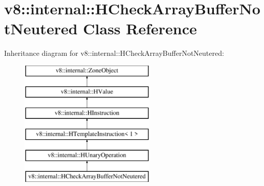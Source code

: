 \hypertarget{classv8_1_1internal_1_1_h_check_array_buffer_not_neutered}{}\section{v8\+:\+:internal\+:\+:H\+Check\+Array\+Buffer\+Not\+Neutered Class Reference}
\label{classv8_1_1internal_1_1_h_check_array_buffer_not_neutered}
Inheritance diagram for v8\+:\+:internal\+:\+:H\+Check\+Array\+Buffer\+Not\+Neutered\+:\begin{figure}[H]
\begin{center}
\leavevmode
\includegraphics[height=6.000000cm]{classv8_1_1internal_1_1_h_check_array_buffer_not_neutered}
\end{center}
\end{figure}
